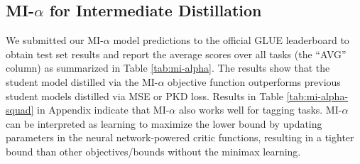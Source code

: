 \documentclass[11pt]{article}
\begin{document}
\subsection{MI-$\alpha$ for Intermediate Distillation}
We submitted our MI-$\alpha$ model predictions to the official GLUE leaderboard to obtain test set results and report the average scores over all tasks (the ``AVG'' column) as summarized in Table \ref{tab:mi-alpha}. The results show that the student model distilled via the MI-$\alpha$ objective function outperforms previous student models distilled via MSE or PKD loss.
Results in Table \ref{tab:mi-alpha-squad} in Appendix indicate that MI-$\alpha$ also works well for tagging tasks. MI-$\alpha$ can be interpreted as learning to maximize the lower bound by updating parameters in the neural network-powered critic functions, resulting in a tighter bound than other objectives/bounds without the minimax learning.



\end{document}
